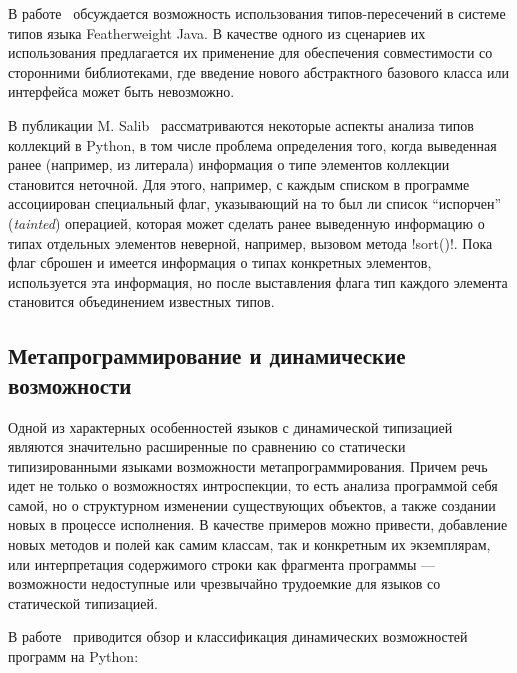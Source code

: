 
В работе~\cite{Igarashi2006} обсуждается возможность использования
типов-пересечений в системе типов языка Featherweight Java. В качестве одного из
сценариев их использования предлагается их применение для обеспечения
совместимости со сторонними библиотеками, где введение нового абстрактного
базового класса или интерфейса может быть невозможно.  

В публикации M. Salib~\cite{Salib2004} рассматриваются некоторые аспекты анализа
типов коллекций в Python, в том числе проблема определения того, когда
выведенная ранее (например, из литерала) информация о типе элементов коллекции
становится неточной. Для этого, например, с каждым списком в программе ассоциирован
специальный флаг, указывающий на то был ли список ``испорчен'' (\emph{tainted})
операцией, которая может сделать ранее выведенную информацию о типах отдельных
элементов неверной, например, вызовом метода !sort()!. Пока флаг сброшен и имеется
информация о типах конкретных элементов, используется эта информация, но после
выставления флага тип каждого элемента становится объединением известных типов.

\subsection{Метапрограммирование и динамические возможности}

Одной из характерных особенностей языков с динамической типизацией являются
значительно расширенные по сравнению со статически типизированными языками
возможности метапрограммирования. Причем речь идет не только о возможностях
интроспекции, то есть анализа программой себя самой, но о
структурном изменении существующих объектов, а также создании новых
в процессе исполнения. В качестве примеров можно привести, добавление новых
методов и полей как самим классам, так и конкретным их экземплярам, или
интерпретация содержимого строки как фрагмента программы --- возможности
недоступные или чрезвычайно трудоемкие для языков со статической типизацией.

В работе~\cite{Holkner2009} приводится обзор и классификация динамических
возможностей программ на Python: 

